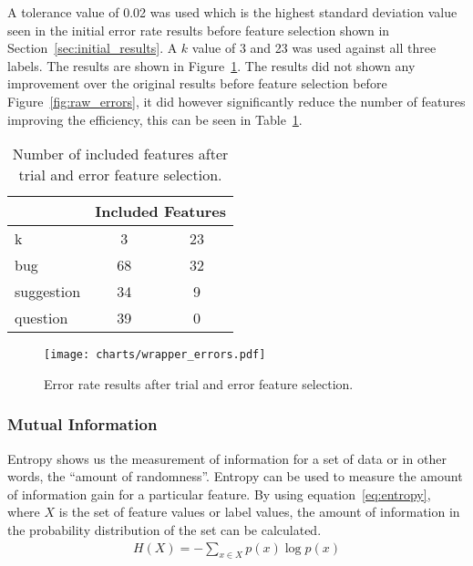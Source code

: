 A tolerance value of 0.02 was used which is the highest standard deviation value seen in the initial error rate results before
feature selection shown in Section~\ref{sec:initial_results}. A $k$ value of 3 and 23 was used against all three labels. The
results are shown in Figure~\ref{fig:trialerror_errors}. The results did not shown any improvement over the original results
before feature selection before Figure~\ref{fig:raw_errors}, it did however significantly reduce the number of features
improving the efficiency, this can be seen in Table~\ref{tbl:trialerror_inc_features}.

\begin{table}[h]
    \centering
    \begin{tabular}{l|c|c}
                   & \multicolumn{2}{l}{Included Features} \\
        \hline
        k          & 3                 & 23                \\
        \hline
        bug        & 68                & 32                \\
        suggestion & 34                & 9                 \\
        question   & 39                & 0                 \\
        \hline
    \end{tabular}
    \caption{Number of included features after trial and error feature selection.}
    \label{tbl:trialerror_inc_features}
\end{table}

\begin{figure}[h]
    \centering
    \texttt{[image: charts/wrapper\_errors.pdf]}
    \caption{Error rate results after trial and error feature selection.}
    \label{fig:trialerror_errors}
\end{figure}

\subsubsection{Mutual Information}
\label{sec:mutual_informaton}
Entropy shows us the measurement of information for a set of data or in other words, the ``amount of randomness''. Entropy can
be used to measure the amount of information gain for a particular feature. By using equation~\ref{eq:entropy}, where $X$ is
the set of feature values or label values, the amount of information in the probability distribution of the set can be calculated.
\begin{align}
    \label{eq:entropy}
    H(X) = -\sum_{x \in X} p(x) \log p(x)
\end{align}

